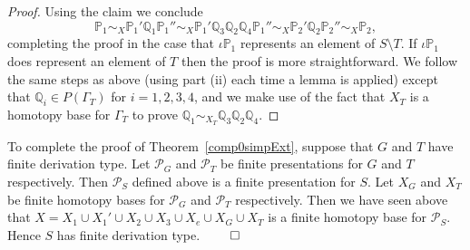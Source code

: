 \documentclass[11pt]{amsart}
\theoremstyle{plain}
\begin{document}
\begin{proof}
Using the claim we conclude 
\[
{\mathbb{P}}_1 \sim_X
{\mathbb{P}}_1' {\mathbb{Q}}_1 {\mathbb{P}}_1'' \sim_X
{\mathbb{P}}_1' {\mathbb{Q}}_3 {\mathbb{Q}}_2 {\mathbb{Q}}_4 {\mathbb{P}}_1'' \sim_X
{\mathbb{P}}_2' {\mathbb{Q}}_2 {\mathbb{P}}_2'' \sim_X
{\mathbb{P}}_2,
\]
completing the proof in the case that $\iota {\mathbb{P}}_1$ represents an element of $S \setminus T$.
If $\iota {\mathbb{P}}_1$ does represent an element of $T$ then the proof is more straightforward. We follow the same steps as above (using part (ii) each time a lemma is applied) except that ${\mathbb{Q}}_i \in P(\Gamma_T)$ for $i=1,2,3,4$, and we make use of the fact that $X_T$ is a homotopy base for $\Gamma_T$ to prove ${\mathbb{Q}}_1 \sim_{X_T} {\mathbb{Q}}_3 {\mathbb{Q}}_2 {\mathbb{Q}}_4$.
\end{proof}

To complete the proof of Theorem~\ref{comp0simpExt}, suppose that $G$ and $T$ have finite derivation type. Let $\mathcal{P}_G$ and $\mathcal{P}_T$ be finite presentations for $G$ and $T$ respectively. Then $\mathcal{P}_S$ defined above is a finite presentation for $S$. Let $X_G$ and $X_T$ be finite homotopy bases for $\mathcal{P}_G$ and $\mathcal{P}_T$ respectively. Then we have seen above that $X = X_1 \cup X_1' \cup X_2 \cup X_3 \cup X_e \cup X_G \cup X_T$ is a finite homotopy base for $\mathcal{P}_S$. Hence $S$ has finite derivation type. $\qed$
\end{document}
